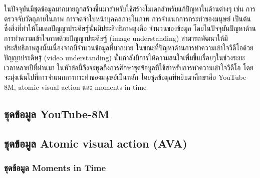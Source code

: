 \label{sec:dataset}
ในปัจจุบันมีชุดข้อมูลมากมายถูกสร้างขึ้นมาสำหรับใช้สร้างโมเดลสำหรับแก้ปัญหาในด้านต่างๆ เช่น การตรวจจับวัตถุภายในภาพ
การจดจำใบหน้าบุคคลภายในภาพ การจำแนกการกระทำของมนุษย์ เป็นต้น ซึ่งสิ่งที่ทำให้โมเดลปัญญาประดิษฐ์นั้นมีประสิทธิภาพสูงคือ
จำนวนของข้อมูล โดยในปัจจุบันปัญหาด้านการทำความเข้าใจภาพด้วยปัญญาประดิษฐ์ (image understanding) 
สามารถพัฒนาให้มีประสิทธิภาพสูงนั้นเนื่องจากมีจำนวนข้อมูลที่มากมาย ในขณะที่ปัญหาด้านการทำความเข้าใจวิดีโอด้วยปัญญาประดิษฐ์ (video understanding) 
นั้นกำลังมีการให้ความสนใจเพิ่มขึ้นเรื่อยๆในช่วงระยะเวลาหลายปีที่ผ่านมา ในหัวข้อนี้จึงจะพูดถึงการศึกษาชุดข้อมูลที่ใช้สำหรับการทำความเข้าใจวิดีโอ 
โดยจะมุ่งเน้นไปที่การจำแนกการกระทำของมนุษย์เป็นหลัก โดยชุดข้อมูลที่หยิบมาศึกษาคือ YouTube-8M, atomic visual action และ moments in time

\subsection*{ชุดข้อมูล YouTube-8M} 

\clearpage
\subsection*{ชุดข้อมูล Atomic visual action (AVA)}	

\clearpage
\subsubsection*{ชุดข้อมูล Moments in Time}
